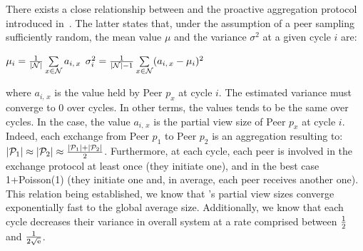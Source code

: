 There exists a close relationship between \SPRAY{} and the proactive
aggregation protocol introduced
in~\cite{jelasity2004epidemic,montresor2004robust}. The latter states that,
under the assumption of a peer sampling sufficiently random, the mean value
$\mu$ and the variance $\sigma^2$ at a given cycle $i$ are:
\begin{center}
  $\mu_i = {1\over{|\mathcal{N}|}} \sum\limits_{x \in \mathcal{N}} a_{i,\,x}$
  \hfill
  $\sigma^2_i = {1\over{|\mathcal{N}|-1}}\sum\limits_{x \in \mathcal{N}}
  (a_{i,\,x} - \mu_i)^2$
\end{center}
where $a_{i,\,x}$ is the value held by Peer $p_x$ at cycle $i$. The estimated
variance must converge to $0$ over cycles. In other terms, the values tends to
be the same over cycles. In the \SPRAY{} case, the value $a_{i,\,x}$ is the
partial view size of Peer $p_x$ at cycle $i$. Indeed, each exchange from Peer
$p_1$ to Peer $p_2$ is an aggregation resulting to:
$|\mathcal{P}_1|\approx|\mathcal{P}_2|\approx{|\mathcal{P}_1| + |\mathcal{P}_2|
  \over{2}}$.
Furthermore, at each cycle, each peer is involved in the exchange protocol at
least once (they initiate one), and in the best case 1+Poisson(1) (they
initiate one and, in average, each peer receives another one). This relation
being established, we know that \SPRAY{}'s partial view sizes converge
exponentially fast to the global average size. Additionally, we know that each
cycle decreases their variance in overall system at a rate comprised between
${1\over{2}}$ and $1\over{2\sqrt{\text{e}}}$.

